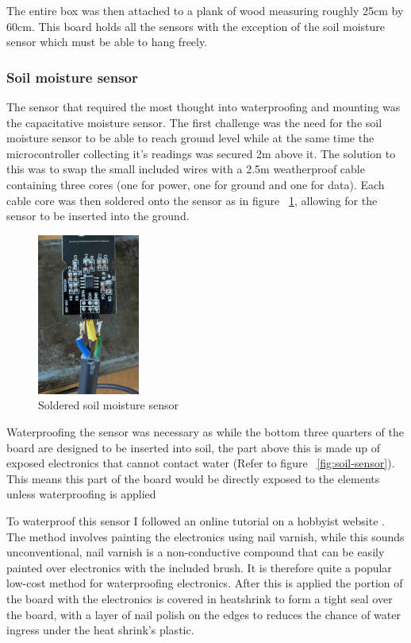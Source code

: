 The entire box was then attached to a plank of wood measuring roughly 25cm by
60cm. This board holds all the sensors with the exception of the soil moisture
sensor which must be able to hang freely.

\subsubsection{Soil moisture sensor}

The sensor that required the most thought into waterproofing and mounting was
the capacitative moisture sensor. The first challenge was the need for the soil
moisture sensor to be able to reach ground level while at the same time the
microcontroller collecting it's readings was secured 2m above it. The solution
to this was to swap the small included wires with a 2.5m weatherproof cable
containing three cores (one for power, one for ground and one for data). Each
cable core was then soldered onto the sensor as in figure
~\ref{fig:solder-soil}, allowing for the sensor to be inserted into the ground.

\begin{figure}[H]
    \centering
    \includegraphics[width=0.3\textwidth]{contents/part-2/fig2/solder-soil.jpeg}
    \caption{Soldered soil moisture sensor}
    \label{fig:solder-soil}
\end{figure}

Waterproofing the sensor was necessary as while the bottom three quarters of the
board are designed to be inserted into soil, the part above this is made up of
exposed electronics that cannot contact water (Refer to figure
~\ref{fig:soil-sensor}). This means this part of the board would be directly
exposed to the elements unless waterproofing is applied

To waterproof this sensor I followed an online tutorial on a hobbyist website
\cite{waterproof-sensor}. The method involves painting the electronics using
nail varnish, while this sounds unconventional, nail varnish is a non-conductive
compound that can be easily painted over electronics with the included brush. It
is therefore quite a popular low-cost method for waterproofing electronics.
After this is applied the portion of the board with the electronics is covered
in heatshrink to form a tight seal over the board, with a layer of nail polish
on the edges to reduces the chance of water ingress under the heat shrink's
plastic.

